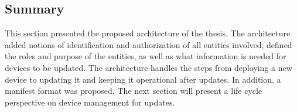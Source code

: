 \documentclass[0-thesis.tex]{subfiles}
\begin{document}
\subsection{Summary}
\label{ssec:architecture-summary}
This section presented the proposed architecture of the thesis. The architecture added
notions of identification and authorization of all entities involved, defined the roles
and purpose of the entities, as well as what information is needed for devices to be
updated. The architecture handles the steps from deploying a new device to updating it and
keeping it operational after updates. In addition, a manifest format was proposed. The
next section will present a life cycle perspective on device management for updates.
\end{document}
